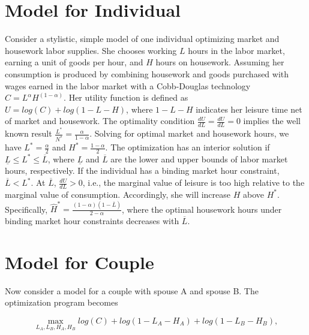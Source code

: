 \documentclass[12pt]{article}
\begin{document}
\baselineskip 24pt
\newtheorem{proposition}{Proposition}
\newtheorem{lemma}{Lemma}
\newtheorem{assumption}{Technical Assumption}
\def\citealt#1{\citename{#1}, \citeyear*{#1}}

\section{Model for Individual}

Consider a stylistic, simple model of one individual optimizing market and housework labor supplies.  She chooses working $L$ hours in the labor market, earning a unit of goods per hour, and $H$ hours on housework.  Assuming her consumption is produced by combining housework and goods purchased with wages earned in the labor market with a Cobb-Douglas technology $C = L^\alpha H^{(1-\alpha)}$. Her utility function is defined as $U = log(C) + log(1 - L - H)$, where $1-L-H$ indicates her leisure time net of market and housework. The optimality condition $\displaystyle\frac{dU}{dL} = \frac{dU}{dL} = 0$ implies the well known result $\displaystyle \frac{L^*}{N^*} = \frac{\alpha}{1-\alpha}$. Solving for optimal market and housework hours, we have $\displaystyle L^* = \frac{\alpha}{2}$ and $\displaystyle H^* = \frac{1-\alpha}{2}$.  The optimization has an interior solution if $\underline{L} \leq L^* \leq \overline{L}$, where $\underline{L}$ and $\overline{L}$ are the lower and upper bounds of labor market hours, respectively. If the individual has a binding market hour constraint, $\overline{L} < L^*$.  At $\overline{L}$, $\displaystyle \frac{dU}{dL} > 0$, i.e., the marginal value of leisure is too high relative to the marginal value of consumption. Accordingly, she will increase $H$ above $H^*$.  Specifically,  $\displaystyle\widehat{H}^* = \frac{(1-\alpha)(1 - \overline{L})}{2-\alpha}$, where the optimal housework hours under binding market hour constraints decreases with $\overline{L}$.

\section{Model for Couple}

Now consider a model for a couple with spouse A and spouse B. The optimization program becomes 

\begin{equation}
\max_{L_A, L_B, H_A, H_B} log(C) + log(1 - L_A - H_A) + log(1 - L_B - H_B), \nonumber
\end{equation}
\end{document}
